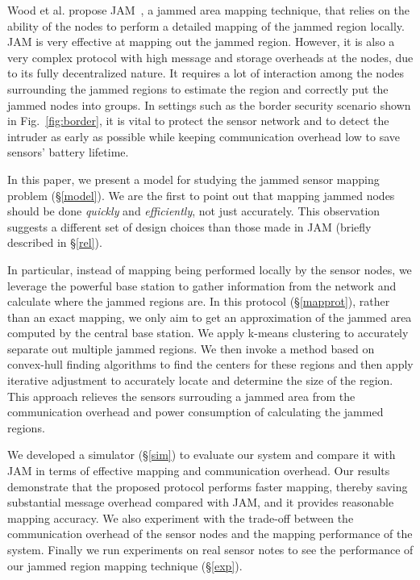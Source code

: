 \documentclass[conference]{IEEEtran}
\begin{document}
Wood et al. propose JAM~\cite{JAM}, a jammed area mapping technique,
that relies on the ability of the nodes to perform a detailed mapping
of the jammed region locally. JAM is very effective at mapping out the
jammed region. However, it is also a very complex protocol with high
message and storage overheads at the nodes, due to its fully
decentralized nature. It requires a lot of interaction among the nodes
surrounding the jammed regions to estimate the region and correctly put
the jammed nodes into groups. In settings such as the border security
scenario shown in Fig.~\ref{fig:border}, it is vital to protect the
sensor network and to detect the intruder as early as possible while
keeping communication overhead low to save sensors' battery lifetime.

 In this paper, we present a model for
studying the jammed sensor mapping problem (\S\ref{model}). We are the
first to point out that mapping jammed nodes should be done {\em
  quickly} and {\em efficiently}, not just accurately. This observation
suggests a different set of design choices than those made in JAM
(briefly described in \S\ref{rel}).


In particular, instead of mapping being performed locally by the sensor
nodes, we leverage the powerful base station to gather information from
the network and calculate where the jammed regions are. In this protocol
(\S\ref{mapprot}), rather than an exact mapping, we only aim to get an
approximation of the jammed area computed by the central base
station. We apply k-means clustering to accurately separate out multiple
jammed regions. We then invoke a method based on convex-hull finding
algorithms to find the centers for these regions and then apply
iterative adjustment to accurately locate and determine the size of the
region. This approach relieves the sensors surrouding a jammed area from
the communication overhead and power consumption of calculating the
jammed regions.


We developed a simulator (\S\ref{sim}) to evaluate our system and
compare it with JAM in terms of effective mapping and communication
overhead. Our results demonstrate that the proposed
protocol performs faster mapping, thereby saving substantial message overhead compared with JAM, and it
provides reasonable mapping accuracy. We also experiment with the
trade-off between the communication overhead of the sensor nodes and the
mapping performance of the system. Finally we run experiments on real sensor notes to see the performance of our jammed region mapping technique (\S\ref{exp}).
\end{document}
